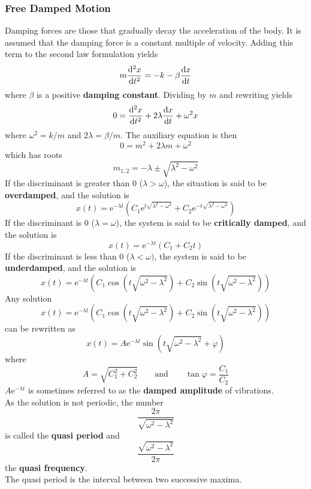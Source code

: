 \documentclass[12pt, A4]{article}
\newcommand{\en}{\text{e}}
\begin{document}
			\subsubsection{Free Damped Motion}
				Damping forces are those that gradually decay the acceleration of the body. It is assumed that the damping force is a constant multiple of velocity. Adding this term to the second law formulation yields
					\[m\dv[2]{x}{t} = -k - \beta\dv{x}{t}\]
					where \(\beta\) is a positive \textbf{damping constant}. Dividing by \(m\) and rewriting yields
					\[0 = \dv[2]{x}{t} + 2\lambda \dv{x}{t} + \omega^2 x\]
					where \(\omega^2 = k/m\) and \(2\lambda = \beta/m\). The auxiliary equation is then
					\[0 = m^2 + 2\lambda m + \omega^2\]
					which has roots
					\[m_{1, 2} = -\lambda \pm \sqrt{\lambda^2 - \omega^2}\]
				If the discriminant is greater than 0 (\(\lambda > \omega\)), the situation is said to be \textbf{overdamped}, and the solution is
					\[x(t) = \en^{-\lambda t}\left(C_1\en^{t\sqrt{\lambda^2 - \omega^2}} + C_2\en^{-t\sqrt{\lambda^2 - \omega^2}}\right)\]
					If the discriminant is 0 (\(\lambda = \omega\)), the system is said to be \textbf{critically damped}, and the solution is
					\[x(t) = \en^{-\lambda t}\left(C_1 + C_2t\right)\]
					If the discriminant is less than 0 (\(\lambda < \omega)\), the system is said to be \textbf{underdamped}, and the solution is
					\[x(t) = \en^{-\lambda t}\left(C_1\cos(t\sqrt{\omega^2 - \lambda^2}) + C_2\sin(t\sqrt{\omega^2 - \lambda^2})\right)\]
				Any solution
					\[x(t) = \en^{-\lambda t}\left(C_1\cos\left(t\sqrt{\omega^2 - \lambda^2}\right) + C_2\sin\left(t\sqrt{\omega^2 - \lambda^2}\right)\right)\]
					can be rewritten as
					\[x(t) = A\en^{-\lambda t}\sin\left(t\sqrt{\omega^2 - \lambda^2} + \varphi\right)\]
					where
					\[
						A = \sqrt{C_1^2 + C_2^2} \qquad \text{and} \qquad
						\tan\varphi = \frac{C_1}{C_2}
					\]
					\(A\en^{-\lambda t}\) is sometimes referred to as the \textbf{damped amplitude} of vibrations. \\
				As the solution is not periodic, the number
					\[\frac{2\pi}{\sqrt{\omega^2 - \lambda^2}}\]	
					is called the \textbf{quasi period} and
					\[\frac{\sqrt{\omega^2 - \lambda^2}}{2\pi}\]
					the \textbf{quasi frequency}. \\
					The quasi period is the interval between two successive maxima.
\end{document}
